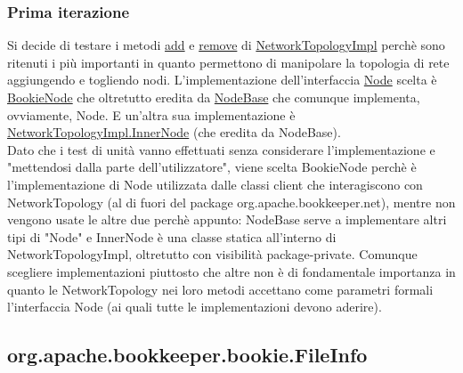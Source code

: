 \documentclass[10pt, a4paper]{article}
\begin{document}
	\subsubsection{Prima iterazione}
	Si decide di testare i metodi 
	\href{https://bookkeeper.apache.org/docs/latest/api/javadoc/org/apache/bookkeeper/net/NetworkTopologyImpl.html#add(org.apache.bookkeeper.net.Node)}{add} e 
	\href{https://bookkeeper.apache.org/docs/latest/api/javadoc/org/apache/bookkeeper/net/NetworkTopologyImpl.html#remove(org.apache.bookkeeper.net.Node)}{remove}
	di \href{https://bookkeeper.apache.org/docs/latest/api/javadoc/org/apache/bookkeeper/net/NetworkTopologyImpl.html}{NetworkTopologyImpl} 
	perchè sono ritenuti i più importanti in quanto permettono di manipolare la topologia di rete aggiungendo e togliendo nodi.
	L'implementazione dell'interfaccia
	\href{https://bookkeeper.apache.org/docs/latest/api/javadoc/org/apache/bookkeeper/net/Node.html}{Node} scelta è
	\href{https://bookkeeper.apache.org/docs/latest/api/javadoc/org/apache/bookkeeper/net/BookieNode.html}{BookieNode} che oltretutto eredita da 
	\href{https://bookkeeper.apache.org/docs/latest/api/javadoc/org/apache/bookkeeper/net/NodeBase.html}{NodeBase} 
	che comunque implementa, ovviamente, Node. E un'altra sua implementazione è
	\href{https://bookkeeper.apache.org/docs/latest/api/javadoc/org/apache/bookkeeper/net/NetworkTopologyImpl.InnerNode.html}{NetworkTopologyImpl.InnerNode} (che eredita da NodeBase).
	\\
	Dato che i test di unità vanno effettuati senza considerare l'implementazione e "mettendosi dalla parte dell'utilizzatore", viene scelta BookieNode perchè è l'implementazione di 
	Node utilizzata dalle classi client che interagiscono con NetworkTopology (al di fuori del package org.apache.bookkeeper.net), mentre non vengono usate le altre due perchè appunto: 
	NodeBase serve a implementare altri tipi di "Node" e InnerNode è una classe statica all'interno di NetworkTopologyImpl, oltretutto con visibilità package-private.
	Comunque scegliere implementazioni piuttosto che altre non è di fondamentale importanza in quanto le NetworkTopology nei loro metodi accettano come parametri formali l'interfaccia Node
	(ai quali tutte le implementazioni devono aderire).

	\subsection{org.apache.bookkeeper.bookie.FileInfo}
\end{document}
